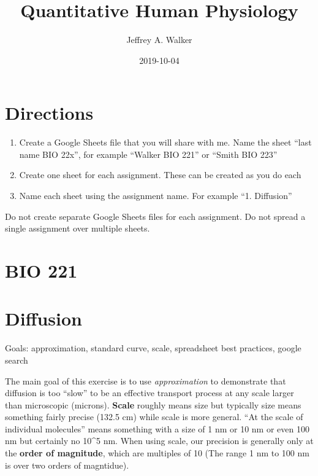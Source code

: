 \documentclass[]{book}
\title{Quantitative Human Physiology}
\author{Jeffrey A. Walker}
\date{2019-10-04}
\begin{document}
\maketitle

{
\setcounter{tocdepth}{1}
\tableofcontents
}
\chapter*{Directions}\label{directions}

\begin{enumerate}
\def\labelenumi{\arabic{enumi}.}
\item
  Create a Google Sheets file that you will share with me. Name the
  sheet ``last name BIO 22x'', for example ``Walker BIO 221'' or ``Smith
  BIO 223''
\item
  Create one sheet for each assignment. These can be created as you do
  each
\item
  Name each sheet using the assignment name. For example ``1.
  Diffusion''
\end{enumerate}

Do not create separate Google Sheets files for each assignment. Do not
spread a single assignment over multiple sheets.

\chapter*{BIO 221}\label{bio-221}

\chapter{Diffusion}\label{diffusion}

Goals: approximation, standard curve, scale, spreadsheet best practices,
google search

The main goal of this exercise is to use \emph{approximation} to
demonstrate that diffusion is too ``slow'' to be an effective transport
process at any scale larger than microscopic (microns). \textbf{Scale}
roughly means size but typically size means something fairly precise
(132.5 cm) while scale is more general. ``At the scale of individual
molecules'' means something with a size of 1 nm or 10 nm or even 100 nm
but certainly no 10\^{}5 nm. When using scale, our precision is
generally only at the \textbf{order of magnitude}, which are multiples
of 10 (The range 1 nm to 100 nm is over two orders of magntidue).
\end{document}
